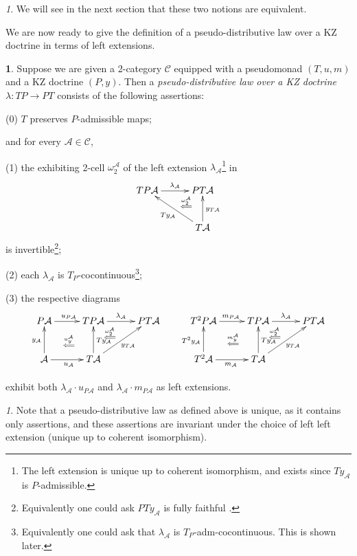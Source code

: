 \documentclass[a4paper,oneside,english]{amsart}
\numberwithin{equation}{section}
\numberwithin{figure}{section}
\theoremstyle{plain}
\theoremstyle{definition}
\newtheorem{defn}[thm]{\protect\definitionname}
\theoremstyle{remark}
\newtheorem{rem}[thm]{\protect\remarkname}
\theoremstyle{definition}
\theoremstyle{plain}
\theoremstyle{plain}
\theoremstyle{plain}
\providecommand{\definitionname}{Definition}
\providecommand{\remarkname}{Remark}
\begin{document}
\begin{rem}
We will see in the next section that these two notions are equivalent.
\end{rem}
We are now ready to give the definition of a pseudo-distributive law
over a KZ doctrine in terms of left extensions.
\begin{defn}
\label{distkzdoctrine} Suppose we are given a 2-category $\mathscr{C}$
equipped with a pseudomonad $\left(T,u,m\right)$ and a KZ doctrine
$\left(P,y\right)$. Then a \emph{pseudo-distributive law over a KZ
doctrine} $\lambda\colon TP\to PT$ consists of the following assertions:

(0) $T$ preserves $P$-admissible maps;

\noindent and for every $\mathcal{A}\in\mathscr{C}$,

(1) the exhibiting 2-cell $\omega_{2}^{\mathcal{A}}$ of the left
extension $\lambda_{\mathcal{A}}$\footnote{The left extension is unique up to coherent isomorphism, and exists since $Ty_{\mathcal{A}}$ is $P$-admissible.}
in
\[
\xymatrix@=1em{TP\mathcal{A}\ar[rr]^{\lambda_{\mathcal{A}}} &  & PT\mathcal{A}\ar@{}[dl]|-{\stackrel{\omega_{2}^{\mathcal{A}}}{\Longleftarrow}}\\
 & \;\\
 &  & T\mathcal{A}\ar[uu]_{y_{T\mathcal{A}}}\ar[uull]^{Ty_{\mathcal{A}}}
}
\]
is invertible\footnote{Equivalently one could ask $PTy_{\mathcal{A}}$  is fully faithful \cite[Prop. 23]{yonedakz}.};

(2) each $\lambda_{\mathcal{A}}$ is $T_{P}$-cocontinuous\footnote{Equivalently one could ask that $\lambda_{\mathcal{A}}$ is $T_{P}$-adm-cocontinuous. This is shown later.}; 

(3) the respective diagrams
\[
\xymatrix@=1em{P\mathcal{A}\ar[rr]^{u_{P\mathcal{A}}} &  & TP\mathcal{A}\ar@{}[dldl]|-{\stackrel{u_{y}^{\mathcal{A}}}{\Longleftarrow}}\ar[rr]^{\lambda_{\mathcal{A}}}\ar@{}[dr]|-{\stackrel{\omega_{2}^{\mathcal{A}}}{\Longleftarrow}} &  & PT\mathcal{A} &  & T^{2}P\mathcal{A}\ar[rr]^{m_{P\mathcal{A}}} &  & TP\mathcal{A}\ar@{}[dldl]|-{\stackrel{m_{y}^{\mathcal{A}}}{\Longleftarrow}}\ar[rr]^{\lambda_{\mathcal{A}}}\ar@{}[dr]|-{\stackrel{\omega_{2}^{\mathcal{A}}}{\Longleftarrow}} &  & PT\mathcal{A}\\
 &  &  & \; &  &  &  &  &  & \;\\
\mathcal{A}\ar[rr]_{u_{\mathcal{A}}}\ar[uu]^{y_{\mathcal{A}}} &  & T\mathcal{A}\ar[uu]_{Ty_{\mathcal{A}}}\ar[uurr]_{y_{T\mathcal{A}}} &  &  &  & T^{2}\mathcal{A}\ar[rr]_{m_{\mathcal{A}}}\ar[uu]^{T^{2}y_{\mathcal{A}}} &  & T\mathcal{A}\ar[uu]_{Ty_{\mathcal{A}}}\ar[uurr]_{y_{T\mathcal{A}}}
}
\]

exhibit both $\lambda_{\mathcal{A}}\cdot u_{P\mathcal{A}}$ and $\lambda_{\mathcal{A}}\cdot m_{P\mathcal{A}}$
as left extensions.\end{defn}
\begin{rem}
Note that a pseudo-distributive law as defined above is unique, as
it contains only assertions, and these assertions are invariant under
the choice of left left extension (unique up to coherent isomorphism).
\end{rem}
\end{document}
